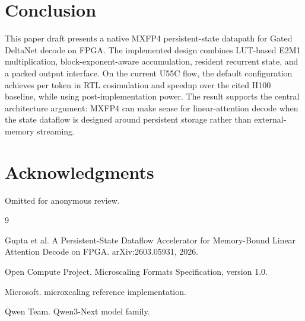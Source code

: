 \documentclass[conference]{IEEEtran}
\begin{document}
\section{Conclusion}

This paper draft presents a native MXFP4 persistent-state datapath for Gated
DeltaNet decode on FPGA. The implemented design combines LUT-based E2M1
multiplication, block-exponent-aware accumulation, resident recurrent state, and
a packed output interface. On the current U55C flow, the default configuration
achieves \OursMxfpFourBThirtyTwoLatencyUs per token in RTL cosimulation and
\HeadlineSpeedupVsHOneHundred speedup over the cited H100 baseline, while using
\OursMxfpFourBThirtyTwoPowerW post-implementation power. The result supports the
central architecture argument: MXFP4 can make sense for linear-attention decode
when the state dataflow is designed around persistent storage rather than
external-memory streaming.

\section*{Acknowledgments}

Omitted for anonymous review.

\begin{thebibliography}{9}

Gupta et al. A Persistent-State Dataflow Accelerator for Memory-Bound Linear
Attention Decode on FPGA. arXiv:2603.05931, 2026.

Open Compute Project. Microscaling Formats Specification, version 1.0.

Microsoft. microxcaling reference implementation.

Qwen Team. Qwen3-Next model family.

\end{thebibliography}
\end{document}
